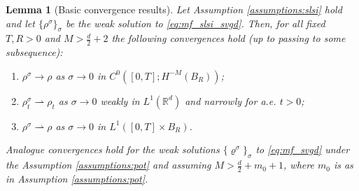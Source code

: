 \documentclass[reqno, 11pt]{amsart}
\numberwithin{equation}{section}
\newtheorem{lem}[thm]{Lemma}
\theoremstyle{definition}
\begin{document}
\begin{lem}[Basic convergence results]\label{lem:basic_conv}
    Let Assumption \ref{assumptions:slsi} hold and let $\{\rho^\sigma\}_\sigma$ be the weak solution to \eqref{eq:mf_slsi_svgd}. Then, for all fixed $T,R>0$ and $M>\frac{d}{2}+2$ the following convergences hold (up to passing to some subsequence):
    \begin{enumerate}[label=(BC\arabic*)]
        \item\label{bnd:conv_cont_curve}  $\rho^\sigma \to \rho$ as $\sigma\rightarrow 0$ in $C^0([0,T]; H^{-M}(B_R))$;
        \item\label{bnd:conv_l1} $\rho^\sigma_t \rightharpoonup \rho_t$ as $\sigma\rightarrow 0$ weakly in $L^1(\mathbb{R}^{d})$ and narrowly for a.e. $t>0$;
        \item\label{rem:l1_weak_conv}
        $\rho^\sigma \rightharpoonup \rho$ as $\sigma\rightarrow 0$ in $L^1([0,T]\times B_R)$.
    \end{enumerate}
    Analogue convergences hold for the weak solutions $\{\varrho^\sigma\}_\sigma$ to \eqref{eq:mf_svgd} under the Assumption \ref{assumptions:pot} and assuming $M>\frac{d}{2}+m_0+1$, where $m_0$ is as in Assumption \ref{assumptions:pot}.
\end{lem}
\end{document}
